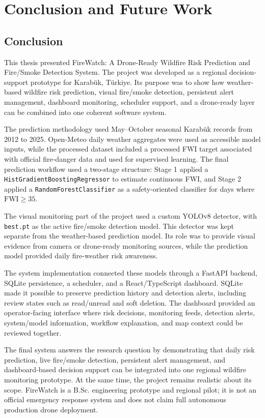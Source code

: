 \chapter{Conclusion and Future Work}

\section{Conclusion}

This thesis presented FireWatch: A Drone-Ready Wildfire Risk Prediction and
Fire/Smoke Detection System. The project was developed as a regional
decision-support prototype for Karabük, Türkiye. Its purpose was to show how
weather-based wildfire risk prediction, visual fire/smoke detection,
persistent alert management, dashboard monitoring, scheduler support, and a
drone-ready layer can be combined into one coherent software system.

The prediction methodology used May--October seasonal Karabük records from
2012 to 2025. Open-Meteo daily weather aggregates were used as accessible
model inputs, while the processed dataset included a processed FWI target
associated with official fire-danger data and used for supervised learning.
The final prediction workflow used a two-stage structure:
Stage 1 applied a \texttt{HistGradientBoostingRegressor} to estimate
continuous FWI, and Stage 2 applied a \texttt{RandomForestClassifier} as a
safety-oriented classifier for days where \( \mathrm{FWI} \geq 35 \).

The visual monitoring part of the project used a custom YOLOv8 detector, with
\texttt{best.pt} as the active fire/smoke detection model. This detector was
kept separate from the weather-based prediction model. Its role was to provide
visual evidence from camera or drone-ready monitoring sources, while the
prediction model provided daily fire-weather risk awareness.

The system implementation connected these models through a FastAPI backend,
SQLite persistence, a scheduler, and a React/TypeScript dashboard. SQLite made
it possible to preserve prediction history and detection alerts, including
review states such as read/unread and soft deletion. The dashboard provided an
operator-facing interface where risk decisions, monitoring feeds, detection
alerts, system/model information, workflow explanation, and map context could
be reviewed together.

The final system answers the research question by demonstrating that daily
risk prediction, live fire/smoke detection, persistent alert management, and
dashboard-based decision support can be integrated into one regional wildfire
monitoring prototype. At the same time, the project remains realistic about
its scope. FireWatch is a B.Sc. engineering prototype and regional pilot; it
is not an official emergency response system and does not claim full
autonomous production drone deployment.

